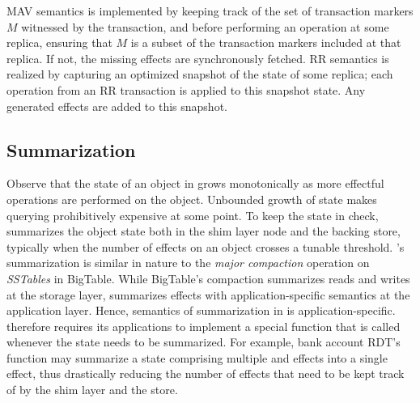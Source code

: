 MAV semantics is implemented by keeping track of the set of
transaction markers $M$ witnessed by the transaction, and before
performing an operation at some replica, ensuring that $M$ is a subset
of the transaction markers included at that replica. If not, the
missing effects are synchronously fetched. RR semantics is realized by
capturing an optimized snapshot of the state of some replica; each
operation from an RR transaction is applied to this snapshot state.
Any generated effects are added to this snapshot.

\subsection{Summarization}

Observe that the state of an object in \name grows monotonically as
more effectful operations are performed on the object. Unbounded
growth of state makes querying prohibitively expensive at some point.
To keep the state in check, \name summarizes the object state both in
the shim layer node and the backing store, typically when the number
of effects on an object crosses a tunable threshold. \name's
summarization is similar in nature to the \emph{major compaction}
operation on \emph{SSTables} in BigTable.  While BigTable's compaction
summarizes reads and writes at the storage layer, \name summarizes
effects with application-specific semantics at the application layer.
Hence, semantics of summarization in \name is application-specific.
\name therefore requires its applications to implement a special
 function that is called whenever the state needs to be
summarized. For example, bank account RDT's  function
may summarize a state comprising multiple  and
 effects into a single  effect, thus
drastically reducing the number of effects that need to be kept track
of by the shim layer and the store.

